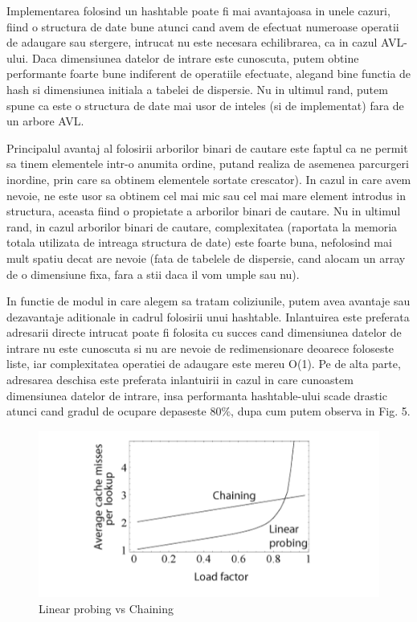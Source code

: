 \documentclass[runningheads]{llncs}
\begin{document}
Implementarea folosind un hashtable poate fi mai avantajoasa in unele cazuri, fiind o structura de date bune atunci cand avem de efectuat numeroase operatii de adaugare sau stergere, intrucat nu este necesara echilibrarea, ca in cazul AVL-ului. Daca dimensiunea datelor de intrare este cunoscuta, putem obtine performante foarte bune indiferent de operatiile efectuate, alegand bine functia de hash si dimensiunea initiala a tabelei de dispersie. Nu in ultimul rand, putem spune ca este o structura de date mai usor de inteles (si de implementat) fara de un arbore AVL. 

Principalul avantaj al folosirii arborilor binari de cautare este faptul ca ne permit sa tinem elementele intr-o anumita ordine, putand realiza de asemenea parcurgeri inordine, prin care sa obtinem elementele sortate crescator). In cazul in care avem nevoie, ne este usor sa obtinem cel mai mic sau cel mai mare element introdus in structura, aceasta fiind o propietate a arborilor binari de cautare. Nu in ultimul rand, in cazul arborilor binari de cautare, complexitatea (raportata la memoria totala utilizata de intreaga structura de date) este foarte buna, nefolosind mai mult spatiu decat are nevoie (fata de tabelele de dispersie, cand alocam un array de o dimensiune fixa, fara a stii daca il vom umple sau nu). 

In functie de modul in care alegem sa tratam coliziunile, putem avea avantaje sau dezavantaje aditionale in cadrul folosirii unui hashtable. Inlantuirea este preferata adresarii directe intrucat poate fi folosita cu succes cand dimensiunea datelor de intrare nu este cunoscuta si nu are nevoie de redimensionare deoarece foloseste liste, iar complexitatea operatiei de adaugare este mereu O(1). Pe de alta parte, adresarea deschisa este preferata inlantuirii in cazul in care cunoastem dimensiunea datelor de intrare, insa performanta hashtable-ului scade drastic atunci cand gradul de ocupare depaseste 80$\%$, dupa cum putem observa in Fig. 5.

\begin{figure}[ht!]
\includegraphics[width=150mm]{5.PNG}
\caption{Linear probing vs Chaining \label{overflow}}
\end{figure}
\end{document}

